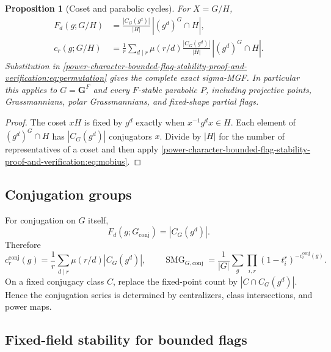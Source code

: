 \documentclass[10pt]{article}
\newcommand{\SMG}{\operatorname{SMG}}
\newcommand{\MGF}{\SMG}
\newtheorem{proposition}{Proposition}
\begin{document}
\begin{proposition}[Coset and parabolic cycles]\label{power-character-bounded-flag-stability-proof-and-verification:prop:coset}
For $X=G/H$,
\begin{align}
F_d(g;G/H)&=\frac{|C_G(g^d)|}{|H|}\,|(g^d)^G\cap H|,\label{power-character-bounded-flag-stability-proof-and-verification:eq:cosetfixed}\\
c_r(g;G/H)&=\frac1r\sum_{d\mid r}\mu(r/d)
 \frac{|C_G(g^d)|}{|H|}\,|(g^d)^G\cap H|.\label{power-character-bounded-flag-stability-proof-and-verification:eq:cosetcycles}
\end{align}
Substitution in \eqref{power-character-bounded-flag-stability-proof-and-verification:eq:permutation} gives the complete exact sigma-MGF.
In particular this applies to $G=\mathbf G^F$ and every $F$-stable parabolic
$P$, including projective points, Grassmannians, polar Grassmannians, and
fixed-shape partial flags.
\end{proposition}

\begin{proof}
The coset $xH$ is fixed by $g^d$ exactly when $x^{-1}g^dx\in H$.  Each element
of $(g^d)^G\cap H$ has $|C_G(g^d)|$ conjugators $x$.  Divide by $|H|$ for the
number of representatives of a coset and then apply \eqref{power-character-bounded-flag-stability-proof-and-verification:eq:mobius}.
\end{proof}

\subsection{Conjugation groups}

For conjugation on $G$ itself,
\[
 F_d(g;G_{\mathrm{conj}})=|C_G(g^d)|.
\]
Therefore
\begin{equation}\label{power-character-bounded-flag-stability-proof-and-verification:eq:conjcycles}
c_r^{\mathrm{conj}}(g)=\frac1r\sum_{d\mid r}\mu(r/d)|C_G(g^d)|,
\qquad
\MGF_{G,\mathrm{conj}}=\frac1{|G|}\sum_g\prod_{i,r}
(1-t_i^r)^{-c_r^{\mathrm{conj}}(g)}.
\end{equation}
On a fixed conjugacy class $C$, replace the fixed-point count by
$|C\cap C_G(g^d)|$.  Hence the conjugation series is determined by
centralizers, class intersections, and power maps.

\subsection{Fixed-field stability for bounded flags}
\end{document}
